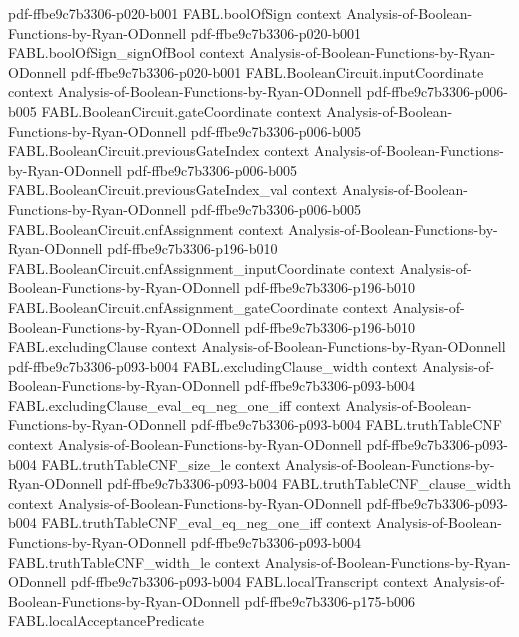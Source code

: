 \begin{theorem}
  {pdf-ffbe9c7b3306-p020-b001}
\proofstep
  {FABL.boolOfSign}
  {context}
  {Analysis-of-Boolean-Functions-by-Ryan-ODonnell}
  {pdf-ffbe9c7b3306-p020-b001}
\proofstep
  {FABL.boolOfSign_signOfBool}
  {context}
  {Analysis-of-Boolean-Functions-by-Ryan-ODonnell}
  {pdf-ffbe9c7b3306-p020-b001}
\proofstep
  {FABL.BooleanCircuit.inputCoordinate}
  {context}
  {Analysis-of-Boolean-Functions-by-Ryan-ODonnell}
  {pdf-ffbe9c7b3306-p006-b005}
\proofstep
  {FABL.BooleanCircuit.gateCoordinate}
  {context}
  {Analysis-of-Boolean-Functions-by-Ryan-ODonnell}
  {pdf-ffbe9c7b3306-p006-b005}
\proofstep
  {FABL.BooleanCircuit.previousGateIndex}
  {context}
  {Analysis-of-Boolean-Functions-by-Ryan-ODonnell}
  {pdf-ffbe9c7b3306-p006-b005}
\proofstep
  {FABL.BooleanCircuit.previousGateIndex_val}
  {context}
  {Analysis-of-Boolean-Functions-by-Ryan-ODonnell}
  {pdf-ffbe9c7b3306-p006-b005}
\proofstep
  {FABL.BooleanCircuit.cnfAssignment}
  {context}
  {Analysis-of-Boolean-Functions-by-Ryan-ODonnell}
  {pdf-ffbe9c7b3306-p196-b010}
\proofstep
  {FABL.BooleanCircuit.cnfAssignment_inputCoordinate}
  {context}
  {Analysis-of-Boolean-Functions-by-Ryan-ODonnell}
  {pdf-ffbe9c7b3306-p196-b010}
\proofstep
  {FABL.BooleanCircuit.cnfAssignment_gateCoordinate}
  {context}
  {Analysis-of-Boolean-Functions-by-Ryan-ODonnell}
  {pdf-ffbe9c7b3306-p196-b010}
\proofstep
  {FABL.excludingClause}
  {context}
  {Analysis-of-Boolean-Functions-by-Ryan-ODonnell}
  {pdf-ffbe9c7b3306-p093-b004}
\proofstep
  {FABL.excludingClause_width}
  {context}
  {Analysis-of-Boolean-Functions-by-Ryan-ODonnell}
  {pdf-ffbe9c7b3306-p093-b004}
\proofstep
  {FABL.excludingClause_eval_eq_neg_one_iff}
  {context}
  {Analysis-of-Boolean-Functions-by-Ryan-ODonnell}
  {pdf-ffbe9c7b3306-p093-b004}
\proofstep
  {FABL.truthTableCNF}
  {context}
  {Analysis-of-Boolean-Functions-by-Ryan-ODonnell}
  {pdf-ffbe9c7b3306-p093-b004}
\proofstep
  {FABL.truthTableCNF_size_le}
  {context}
  {Analysis-of-Boolean-Functions-by-Ryan-ODonnell}
  {pdf-ffbe9c7b3306-p093-b004}
\proofstep
  {FABL.truthTableCNF_clause_width}
  {context}
  {Analysis-of-Boolean-Functions-by-Ryan-ODonnell}
  {pdf-ffbe9c7b3306-p093-b004}
\proofstep
  {FABL.truthTableCNF_eval_eq_neg_one_iff}
  {context}
  {Analysis-of-Boolean-Functions-by-Ryan-ODonnell}
  {pdf-ffbe9c7b3306-p093-b004}
\proofstep
  {FABL.truthTableCNF_width_le}
  {context}
  {Analysis-of-Boolean-Functions-by-Ryan-ODonnell}
  {pdf-ffbe9c7b3306-p093-b004}
\proofstep
  {FABL.localTranscript}
  {context}
  {Analysis-of-Boolean-Functions-by-Ryan-ODonnell}
  {pdf-ffbe9c7b3306-p175-b006}
\proofstep
  {FABL.localAcceptancePredicate}

\end{theorem}
